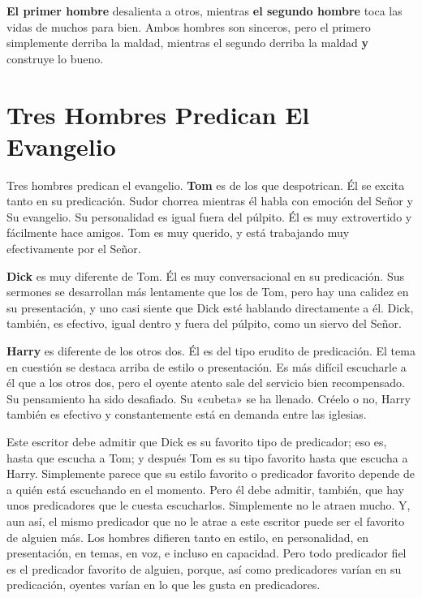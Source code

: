 \documentclass[12pt, twoside, openright]{book}
\begin{document}
\textbf{El primer hombre} desalienta a otros, mientras \textbf{el segundo hombre} toca las vidas de muchos para bien. Ambos hombres son sinceros, pero el primero simplemente derriba la maldad, mientras el segundo derriba la maldad \textbf{y} construye lo bueno. 

\section{Tres Hombres Predican El Evangelio }
Tres hombres predican el evangelio. \textbf{Tom} es de los que despotrican. Él se excita tanto en su predicación. Sudor chorrea mientras él habla con emoción del Señor y Su evangelio. Su personalidad es igual fuera del púlpito. Él es muy extrovertido y fácilmente hace amigos. Tom es muy querido, y está trabajando muy efectivamente por el Señor. 

\textbf{Dick} es muy diferente de Tom. Él es muy conversacional en su predicación. Sus sermones se desarrollan más lentamente que los de Tom, pero hay una calidez en su presentación, y uno casi siente que Dick esté hablando directamente a él. Dick, también, es efectivo, igual dentro y fuera del púlpito, como un siervo del Señor. 

\textbf{Harry} es diferente de los otros dos. Él es del tipo erudito de predicación. El tema en cuestión se destaca arriba de estilo o presentación. Es más difícil escucharle a él que a los otros dos, pero el oyente atento sale del servicio bien recompensado. Su pensamiento ha sido desafiado. Su «cubeta» se ha llenado. Créelo o no, Harry también es efectivo y constantemente está en demanda entre las iglesias. 

Este escritor debe admitir que Dick es su favorito tipo de predicador; eso es, hasta que escucha a Tom; y después Tom es su tipo favorito hasta que escucha a Harry. Simplemente parece que su estilo favorito o predicador favorito depende de a quién está escuchando en el momento. Pero él debe admitir, también, que hay unos predicadores que le cuesta escucharlos. Simplemente no le atraen mucho. Y, aun así, el mismo predicador que no le atrae a este escritor puede ser el favorito de alguien más. Los hombres difieren tanto en estilo, en personalidad, en presentación, en temas, en voz, e incluso en capacidad. Pero todo predicador fiel es el predicador favorito de alguien, porque, así como predicadores varían en su predicación, oyentes varían en lo que les gusta en predicadores. 
\end{document}
